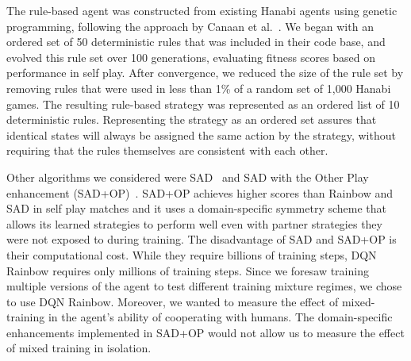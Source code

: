 \documentclass[letterpaper]{article} %
\begin{document}
The rule-based agent was constructed from existing Hanabi agents using genetic programming,  following the approach by  Canaan et al.~.  We began with an ordered  set of 50 deterministic rules   that was included in their code base,  and evolved  this rule set over 100 generations, evaluating fitness scores based on performance in self play. 
After convergence, we reduced the size of the rule set  by  removing rules that were used in less than 1\% of a random set of 1,000 Hanabi games.  The resulting rule-based  strategy was represented as an  ordered list of 10 deterministic rules.  Representing the strategy as an ordered set assures  that identical states will always be assigned the same action by the strategy, without requiring that the rules themselves are consistent with each other.





Other algorithms we considered were SAD~\cite{SAD} and SAD with the Other Play enhancement (SAD+OP)~\cite{OP}. SAD+OP achieves higher scores than Rainbow and SAD in self play matches and it uses a domain-specific symmetry scheme that allows its learned strategies to perform well even with partner strategies they were not exposed to during training. The disadvantage of SAD and SAD+OP is their computational cost. While they require billions of training steps, DQN Rainbow requires only millions of training steps. Since we foresaw training multiple versions of the agent to test different training mixture regimes, we chose to use DQN Rainbow. Moreover, we wanted to measure the effect of mixed-training in the agent's ability of cooperating with humans. The domain-specific enhancements implemented in SAD+OP would not allow us to measure the effect of mixed training in isolation. 


\end{document}
